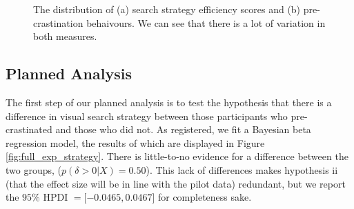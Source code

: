 \documentclass[]{rsos}
\begin{document}
\begin{figure}[t]
  \centering  
  \caption{The distribution of (a) search strategy efficiency scores and (b) pre-crastination behaivours. We can see that there is a lot of variation in both measures. }
  \label{fig:exp2_strat_summary}
\end{figure}

\subsection{Planned Analysis}

The first step of our planned analysis is to test the hypothesis that there is a difference in  visual search strategy between those participants who pre-crastinated and those who did not. As registered, we fit a Bayesian beta regression model, the results of which are displayed in Figure \ref{fig:full_exp_strategy}. There is little-to-no evidence for a difference between the two groups, ($p(\delta >0| X)  =0.50$). This lack of differences makes hypothesis ii (that the effect size will be in line with the pilot data) redundant, but we report the $95\%$ HPDI $= [-0.0465, 0.0467$] for completeness sake.
\end{document}
